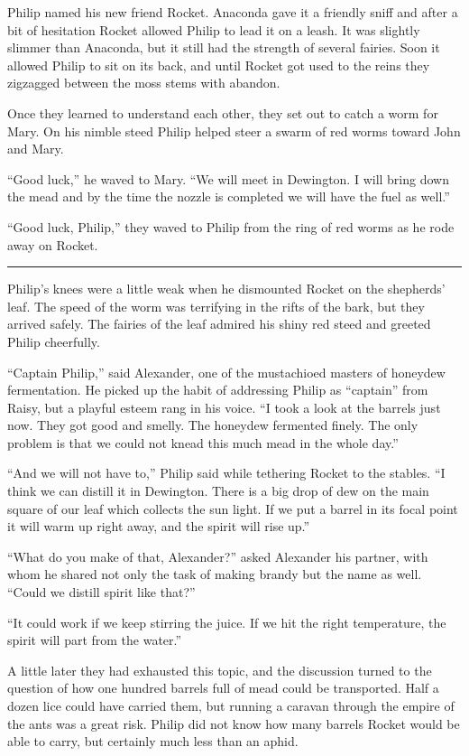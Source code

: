 \documentclass[10pt, draft]{memoir}
\renewcommand{\pfbreakdisplay}{\bigskip \ding{166} \bigskip}
\newcommand{\secbreak}{\fancybreak{\pfbreakdisplay}}
\begin{document}
Philip named his new friend Rocket. Anaconda gave it a friendly sniff and after a bit of hesitation Rocket allowed Philip to lead it on a leash. It was slightly slimmer than Anaconda, but it still had the strength of several fairies. Soon it allowed Philip to sit on its back, and until Rocket got used to the reins they zigzagged between the moss stems with abandon.

Once they learned to understand each other, they set out to catch a worm for Mary. On his nimble steed Philip helped steer a swarm of red worms toward John and Mary.

``Good luck,'' he waved to Mary. ``We will meet in Dewington. I will bring down the mead and by the time the nozzle is completed we will have the fuel as well.''

``Good luck, Philip,'' they waved to Philip from the ring of red worms as he rode away on Rocket.

\secbreak

Philip's knees were a little weak when he dismounted Rocket on the shepherds' leaf. The speed of the worm was terrifying in the rifts of the bark, but they arrived safely. The fairies of the leaf admired his shiny red steed and greeted Philip cheerfully.

``Captain Philip,'' said Alexander, one of the mustachioed masters of honeydew fermentation. He picked up the habit of addressing Philip as ``captain'' from Raisy, but a playful esteem rang in his voice. ``I took a look at the barrels just now. They got good and smelly. The honeydew fermented finely. The only problem is that we could not knead this much mead in the whole day.''

``And we will not have to,'' Philip said while tethering Rocket to the stables. ``I think we can distill it in Dewington. There is a big drop of dew on the main square of our leaf which collects the sun light. If we put a barrel in its focal point it will warm up right away, and the spirit will rise up.''

``What do you make of that, Alexander?'' asked Alexander his partner, with whom he shared not only the task of making brandy but the name as well. ``Could we distill spirit like that?''

``It could work if we keep stirring the juice. If we hit the right temperature, the spirit will part from the water.''

A little later they had exhausted this topic, and the discussion turned to the question of how one hundred barrels full of mead could be transported. Half a dozen lice could have carried them, but running a caravan through the empire of the ants was a great risk. Philip did not know how many barrels Rocket would be able to carry, but certainly much less than an aphid.
\end{document}
